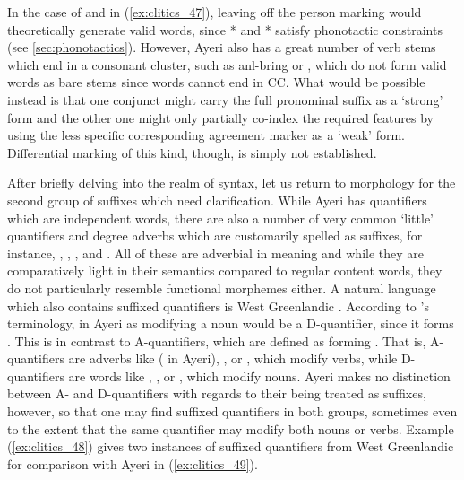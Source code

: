 In the case of  and  in
(\ref{ex:clitics_47}), leaving off the person marking would theoretically
generate valid words, since * and * satisfy
phonotactic constraints (see \autoref{sec:phonotactics}). However, Ayeri also
has a great number of verb stems which end in a consonant cluster, such as
 {anl-}{bring} or , which do not form valid
words as bare stems since words cannot end in CC. What would be possible
instead is that one conjunct might carry the full pronominal suffix as a
`strong' form and the other one might only partially co-index the required
features by using the less specific corresponding agreement marker as a `weak'
form. Differential marking of this kind, though, is simply not established.

\label{clitics_quant}
After briefly delving into the realm of syntax, let us return to morphology for
the second group of suffixes which need clarification. While Ayeri has
quantifiers which are independent words, there are also a number of very common
`little' quantifiers and degree adverbs which are customarily spelled as
suffixes, for instance, ,
, , and
. All of these are adverbial in meaning and while they
are comparatively light in their semantics compared to regular content words,
they do not particularly resemble functional morphemes either. A natural
language which also contains suffixed quantifiers is West Greenlandic
\citep{bittner1995}. According to \citet{bittner1995}'s terminology,
 in Ayeri as modifying a noun would be a D-quantifier, since
it forms .
This is in contrast to A-quantifiers, which are defined as forming
. That is,
A-quantifiers are adverbs like  ( in Ayeri),
, or , which modify verbs, while D-quantifiers are words
like , , or , which modify nouns. Ayeri makes no
distinction between A- and D-quantifiers with regards to their being treated as
suffixes, however, so that one may find suffixed quantifiers in both groups,
sometimes even to the extent that the same quantifier may modify both nouns or
verbs. Example (\ref{ex:clitics_48}) gives two instances of suffixed
quantifiers from West Greenlandic for comparison with Ayeri in
(\ref{ex:clitics_49}).

